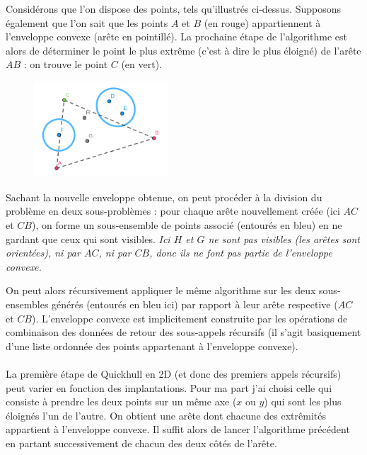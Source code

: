 \documentclass[]{article}
\begin{document}
Considérons que l'on dispose des points, tels qu'illustrés ci-dessus. Supposons également que l'on sait que les points $A$ et $B$ (en rouge) appartiennent à l'enveloppe convexe (arête en pointillé). La prochaine étape de l'algorithme est alors de déterminer le point le plus extrême (c'est à dire le plus éloigné) de l'arête $AB$ : on trouve le point $C$ (en vert).

\begin{figure}[H]
	\begin{center}
		\includegraphics[width=5cm]{qh2d/geogebra-export4.png}
	\end{center}
\end{figure}

Sachant la nouvelle enveloppe obtenue, on peut procéder à la division du problème en deux sous-problèmes : pour chaque arête nouvellement créée (ici $AC$ et $CB$), on forme un sous-ensemble de points associé (entourés en bleu) en ne gardant que ceux qui sont visibles. \emph{Ici $H$ et $G$ ne sont pas visibles (les arêtes sont orientées), ni par $AC$, ni par $CB$, donc ils ne font pas partie de l'enveloppe convexe.}

On peut alors récursivement appliquer le même algorithme sur les deux sous-ensembles générés (entourés en bleu ici) par rapport à leur arête respective ($AC$ et $CB$). L'enveloppe convexe est implicitement construite par les opérations de combinaison des données de retour des sous-appels récursifs (il s'agit basiquement d'une liste ordonnée des points appartenant à l'enveloppe convexe).

\paragraph{}
La première étape de Quickhull en 2D (et donc des premiers appels récursifs) peut varier en fonction des implantations. Pour ma part j'ai choisi celle qui consiste à prendre les deux points sur un même axe ($x$ ou $y$) qui sont les plus éloignés l'un de l'autre. On obtient une arête dont chacune des extrêmités appartient à l'enveloppe convexe. Il suffit alors de lancer l'algorithme précédent en partant successivement de chacun des deux côtés de l'arête.
\end{document}
